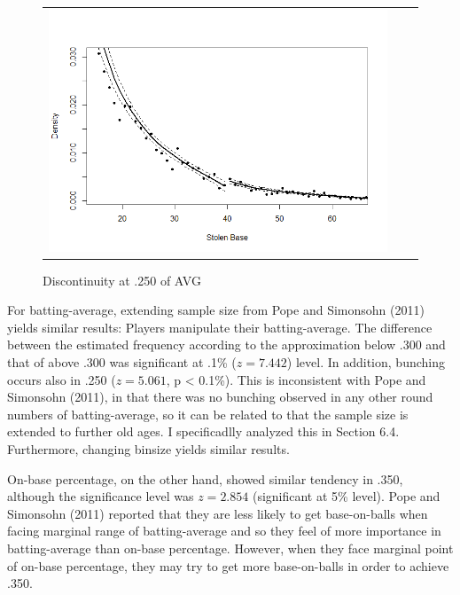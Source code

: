 \documentclass[dvipdfmx, 12pt]{article}
\begin{document}
\begin{figure}
\begin{tabular}{ccc}
          \multicolumn{1}{r}{
          \begin{minipage}{.4\textwidth}
            \includegraphics[keepaspectratio, scale = 0.5, angle = 0]{graphs/SB_40.png}
            \caption{Discontinuity at .250 of AVG}
            \label{DCdensity_SB_40}
          \end{minipage}
          }
        \end{tabular}
      \end{figure}

For batting-average, extending sample size from Pope and Simonsohn (2011) yields similar results: Players manipulate their batting-average. The difference between the estimated frequency according to the approximation below .300 and that of above .300 was significant at .1\% ($z=7.442$) level. In addition, bunching occurs also in .250 ($z = 5.061$, p < 0.1\%). This is inconsistent with Pope and Simonsohn (2011), in that there was no bunching observed in any other round numbers of batting-average, so it can be related to that the sample size is extended to further old ages. I specificadlly analyzed this in Section 6.4. Furthermore, changing binsize yields similar results.

On-base percentage, on the other hand, showed similar tendency in .350, although the significance level was $z=2.854$ (significant at 5\% level). Pope and Simonsohn (2011) reported that they are less likely to get base-on-balls when facing marginal range of batting-average and so they feel of more importance in batting-average than on-base percentage. However, when they face marginal point of on-base percentage, they may try to get more base-on-balls in order to achieve .350.
\end{document}
